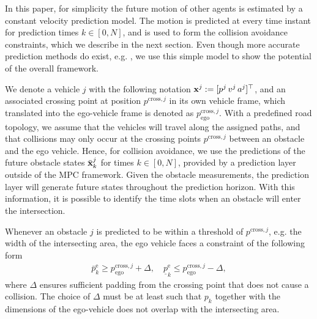 In this paper, for simplicity the future motion of other agents is estimated by a constant velocity prediction model. The motion is predicted at every time instant for prediction times $k\in[0,N]$, and is used to form the collision avoidance constraints, which we describe in the next section. Even though more accurate prediction methods do exist, e.g. \cite{lefevre2014survey,batkovic2018}, we use this simple model to show the potential of the overall framework.

We denote a vehicle $j$ with the following notation ${\mathbf{x}}^j:=[p^j\, v^j\, a^j]^\top$, and an associated crossing point at position $p^{\mathrm{cross},j}$ in its own vehicle frame, which translated into the ego-vehicle frame is denoted as $p^{\mathrm{cross},j}_\mathrm{ego}$. With a predefined road topology, we assume that the vehicles will travel along the assigned paths, and that collisions may only occur at the crossing points $p^{\mathrm{cross},j}$ between an obstacle and the ego vehicle. Hence, for collision avoidance, we use the predictions of the future obstacle states $\bar{{\mathbf{x}}}^j_k$ for times $k\in[0,N]$, provided by a prediction layer outside of the MPC framework. Given the obstacle measurements, the prediction layer will generate future states throughout the prediction horizon. With this information, it is possible to identify the time slots when an obstacle will enter the intersection.

Whenever an obstacle $j$ is predicted to be within a threshold of $p^{\mathrm{cross},j}$, e.g. the width of the intersecting area, the ego vehicle faces a constraint of the following form
\begin{gather*}
\bar{p}_k^\mathrm{e} \geq{} p^{\mathrm{cross},j}_\mathrm{ego} + \Delta,\quad\underline{p}_k^\mathrm{e} \leq{} p^{\mathrm{cross},j}_\mathrm{ego} - \Delta,
\end{gather*}
where $\Delta$ ensures sufficient padding from the crossing point that does not cause a collision. The choice of $\Delta$ must be at least such that $p_k$ together with the dimensions of the ego-vehicle does not overlap with the intersecting area.

